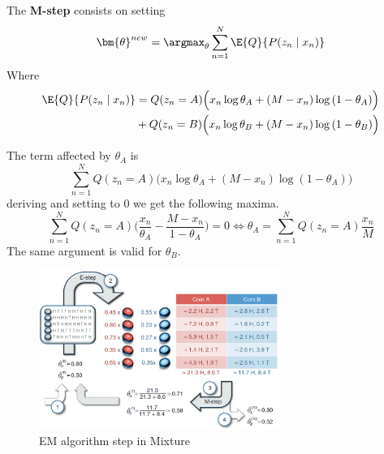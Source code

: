 The \textbf{M-step} consists on setting
\[
  \bm{\theta}^{new} = \argmax_{\theta} \sum_{n=1}^{N}\E{Q}{P(z_{n} \mid x_{n})}
\]
Where
\[
  \begin{aligned}
    \E{Q}{P(z_{n} \mid x_{n})} &= Q(z_{n} = A)\Big( x_{n}\log{\theta_{A}} + (M - x_{n})\log{(1 - \theta_{A})} \Big)\\
    &+ Q(z_{n} = B)\Big( x_{n}\log{\theta_{B}} + (M - x_{n})\log{(1 - \theta_{B})} \Big)
  \end{aligned}
\]

The term affected by \(\theta_{A}\) is
\[
  \sum_{n=1}^{N} Q(z_{n}=A) \Big(x_{n}\log{\theta_{A}} + (M - x_{n})\log{(1-\theta_{A})}\Big)
\]
deriving and setting to \(0\) we get the following maxima.
\[
  \sum_{n=1}^{N}Q(z_{n}=A)\Big(\frac{x_{n}}{\theta_{A}} - \frac{M - x_{n}}{1- \theta_{A}}\Big) = 0 \iff \theta_{A} = \sum_{n=1}^{N}Q(z_{n}=A)\frac{x_{n}}{M}
\]
The same argument is valid for \(\theta_{B}\).

\begin{figure}
  \centering
  \includegraphics[width=0.7\textwidth]{Chapters/BayesianNetworksLearning/mixture}
  \caption{EM algorithm step in Mixture \cite{do2008expectation}}\label{fig:mixture}
\end{figure}

